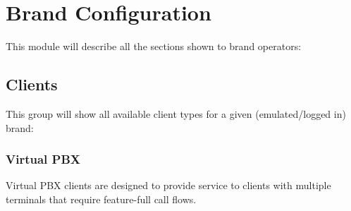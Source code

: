 \documentclass[letterpaper,10pt,english]{sphinxmanual}
\begin{document}
\chapter{Brand Configuration}
\label{administration_portal/brand/index::doc}\label{administration_portal/brand/index:brand-configuration}
This module will describe all the sections shown to brand operators:


\section{Clients}
\label{administration_portal/brand/clients/index:clients}\label{administration_portal/brand/clients/index::doc}
This group will show all available client types for a given (emulated/logged in) brand:


\subsection{Virtual PBX}
\label{administration_portal/brand/clients/virtual_pbx:id1}\label{administration_portal/brand/clients/virtual_pbx::doc}\label{administration_portal/brand/clients/virtual_pbx:virtual-pbx}
Virtual PBX clients are designed to provide service to clients with multiple terminals
that require feature-full call flows.
\end{document}
